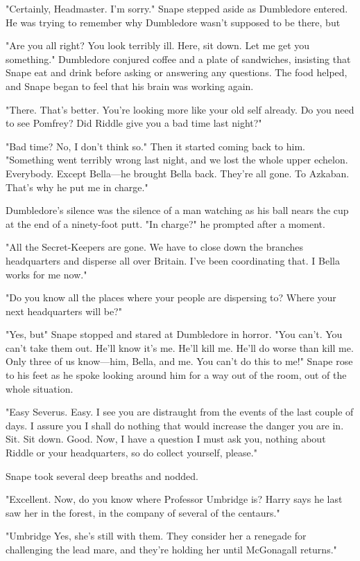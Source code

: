"Certainly, Headmaster. I'm sorry." Snape stepped aside as Dumbledore entered. He was trying to remember why Dumbledore wasn't supposed to be there, but{\el}

"Are you all right? You look terribly ill. Here, sit down. Let me get you something." Dumbledore conjured coffee and a plate of sandwiches, insisting that Snape eat and drink before asking or answering any questions. The food helped, and Snape began to feel that his brain was working again.

"There. That's better. You're looking more like your old self already. Do you need to see Pomfrey? Did Riddle give you a bad time last night?"

"Bad time? No, I don't think so." Then it started coming back to him. "Something went terribly wrong last night, and we lost the whole upper echelon. Everybody. Except Bella—he brought Bella back. They're all gone. To Azkaban. That's why he put me in charge."

Dumbledore's silence was the silence of a man watching as his ball nears the cup at the end of a ninety-foot putt. "In charge?" he prompted after a moment.

"All the Secret-Keepers are gone. We have to close down the branches{\el} headquarters{\el} and disperse all over Britain. I've been coordinating that. I{\el} Bella works for me now."

"Do you know all the places where your people are dispersing to? Where your next headquarters will be?"

"Yes, but{\el}" Snape stopped and stared at Dumbledore in horror. "You can't. You can't take them out. He'll know it's me. He'll kill me. He'll do worse than kill me. Only three of us know—him, Bella, and me. You can't do this to me!" Snape rose to his feet as he spoke looking around him for a way out of the room, out of the whole situation.

"Easy Severus. Easy. I see you are distraught from the events of the last couple of days. I assure you I shall do nothing that would increase the danger you are in. Sit. Sit down. Good. Now, I have a question I must ask you, nothing about Riddle or your headquarters, so do collect yourself, please."

Snape took several deep breaths and nodded.

"Excellent. Now, do you know where Professor Umbridge is? Harry says he last saw her in the forest, in the company of several of the centaurs."

"Umbridge{\el} Yes, she's still with them. They consider her a renegade for challenging the lead mare, and they're holding her until McGonagall returns."

